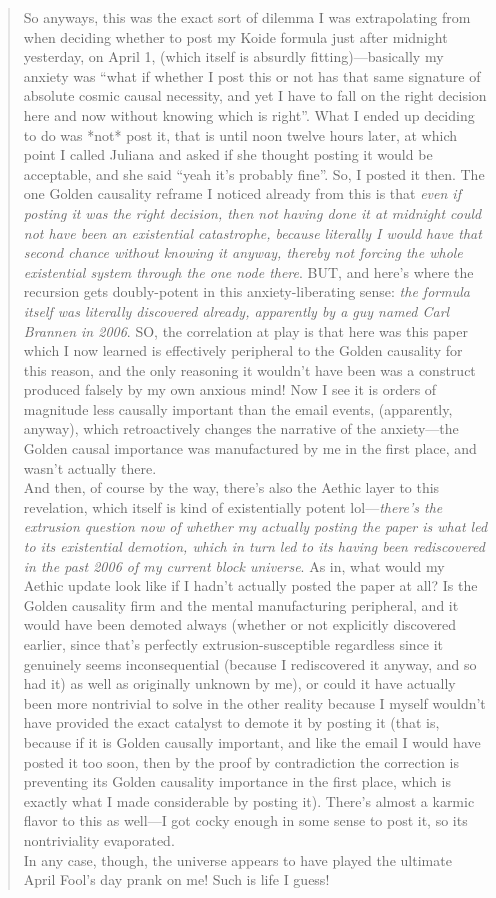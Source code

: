 \begin{quote}
So anyways, this was the exact sort of dilemma I was extrapolating from when deciding whether to post my Koide formula just after midnight yesterday, on April 1, (which itself is absurdly fitting)---basically my anxiety was ``what if whether I post this or not has that same signature of absolute cosmic causal necessity, and yet I have to fall on the right decision here and now without knowing which is right''. What I ended up deciding to do was *not* post it, that is until noon twelve hours later, at which point I called Juliana and asked if she thought posting it would be acceptable, and she said ``yeah it's probably fine''. So, I posted it then. The one Golden causality reframe I noticed already from this is that \textit{even if posting it was the right decision, then not having done it at midnight could not have been an existential catastrophe, because literally I would have that second chance without knowing it anyway, thereby not forcing the whole existential system through the one node there}. BUT, and here's where the recursion gets doubly-potent in this anxiety-liberating sense: \textit{the formula itself was literally discovered already, apparently by a guy named Carl Brannen \cite{Brannen2006TheLM} in 2006}. SO, the correlation at play is that here was this paper which I now learned is effectively peripheral to the Golden causality for this reason, and the only reasoning it wouldn't have been was a construct produced falsely by my own anxious mind! Now I see it is orders of magnitude less causally important than the email events, (apparently, anyway), which retroactively changes the narrative of the anxiety---the Golden causal importance was manufactured by me in the first place, and wasn't actually there.  \\
And then, of course by the way, there's also the Aethic layer to this revelation, which itself is kind of existentially potent lol---\textit{there's the extrusion question now of whether my actually posting the paper is what led to its existential demotion, which in turn led to its having been rediscovered in the past 2006 of my current block universe}. As in, what would my Aethic update look like if I hadn't actually posted the paper at all? Is the Golden causality firm and the mental manufacturing peripheral, and it would have been demoted always (whether or not explicitly discovered earlier, since that's perfectly extrusion-susceptible regardless since it genuinely seems inconsequential (because I rediscovered it anyway, and so had it) as well as originally unknown by me), or could it have actually been more nontrivial to solve in the other reality because I myself wouldn't have provided the exact catalyst to demote it by posting it (that is, because if it is Golden causally important, and like the email I would have posted it too soon, then by the proof by contradiction the correction is preventing its Golden causality importance in the first place, which is exactly what I made considerable by posting it). There's almost a karmic flavor to this as well---I got cocky enough in some sense to post it, so its nontriviality evaporated.   \\
In any case, though, the universe appears to have played the ultimate April Fool's day prank on me! Such is life I guess!
\end{quote}
